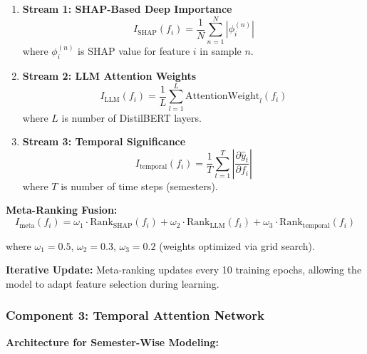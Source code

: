 \begin{enumerate}
\item \textbf{Stream 1: SHAP-Based Deep Importance}
\begin{equation}
I_{\text{SHAP}}(f_i) = \frac{1}{N} \sum_{n=1}^{N} |\phi_i^{(n)}|
\end{equation}
where $\phi_i^{(n)}$ is SHAP value for feature $i$ in sample $n$.

\item \textbf{Stream 2: LLM Attention Weights}
\begin{equation}
I_{\text{LLM}}(f_i) = \frac{1}{L} \sum_{l=1}^{L} \text{AttentionWeight}_l(f_i)
\end{equation}
where $L$ is number of DistilBERT layers.

\item \textbf{Stream 3: Temporal Significance}
\begin{equation}
I_{\text{temporal}}(f_i) = \frac{1}{T} \sum_{t=1}^{T} \left| \frac{\partial \hat{y}_t}{\partial f_i} \right|
\end{equation}
where $T$ is number of time steps (semesters).
\end{enumerate}

\textbf{Meta-Ranking Fusion:}
\begin{equation}
I_{\text{meta}}(f_i) = \omega_1 \cdot \text{Rank}_{\text{SHAP}}(f_i) + \omega_2 \cdot \text{Rank}_{\text{LLM}}(f_i) + \omega_3 \cdot \text{Rank}_{\text{temporal}}(f_i)
\end{equation}

where $\omega_1 = 0.5$, $\omega_2 = 0.3$, $\omega_3 = 0.2$ (weights optimized via grid search).

\textbf{Iterative Update:}
Meta-ranking updates every 10 training epochs, allowing the model to adapt feature selection during learning.

\subsubsection{Component 3: Temporal Attention Network}

\textbf{Architecture for Semester-Wise Modeling:}

